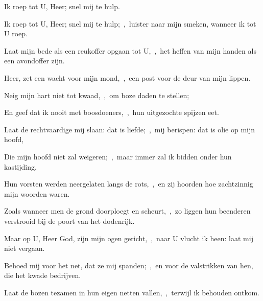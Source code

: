 \documentclass[12pt,twoside,a5paper]{article}
\begin{document}


\begin{halfparskip}

   Ik roep tot U, Heer; snel mij te hulp.


  Ik roep tot U, Heer; snel mij te hulp;~\sep\ luister naar mijn smeken, wanneer ik tot U roep.

  Laat mijn bede als een reukoffer opgaan tot U,~\sep\ het heffen van mijn handen als een avondoffer zijn.

  Heer, zet een wacht voor mijn mond,~\sep\ een post voor de deur van mijn lippen.

  Neig mijn hart niet tot kwaad,~\sep\ om boze daden te stellen;

  En geef dat ik nooit met boosdoeners,~\sep\ hun uitgezochte spijzen eet.

  Laat de rechtvaardige mij slaan: dat is liefde;~\sep\ mij berispen: dat is olie op mijn hoofd,

  Die mijn hoofd niet zal weigeren;~\sep\ maar immer zal ik bidden onder hun kastijding.

  Hun vorsten werden neergelaten langs de rots,~\sep\ en zij hoorden hoe zachtzinnig mijn woorden waren.

  Zoals wanneer men de grond doorploegt en scheurt,~\sep\ zo liggen hun beenderen verstrooid bij de poort van het dodenrijk.

  Maar op U, Heer God, zijn mijn ogen gericht,~\sep\ naar U vlucht ik heen: laat mij niet vergaan.

  Behoed mij voor het net, dat ze mij spanden;~\sep\ en voor de valstrikken van hen, die het kwade bedrijven.

  Laat de bozen tezamen in hun eigen netten vallen,~\sep\ terwijl ik behouden ontkom.
\end{halfparskip}
\end{document}
